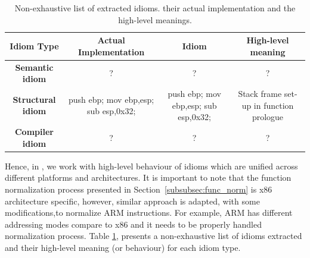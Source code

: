 \begin{table}[!th]
	\begin{center}
  \begin{tabular}{|c|c|c|c|}
  \hline
  \rule[-1ex]{0pt}{2.5ex} \textbf{Idiom Type} & \textbf{Actual Implementation} & \textbf{Idiom} & \textbf{High-level meaning} \\
  \hline
  \rule[-1ex]{0pt}{2.5ex} \textbf{Semantic idiom} & ? & ? & ? \\
  \hline
  \rule[-1ex]{0pt}{2.5ex} \textbf{Structural idiom} & {push ebp;	mov ebp,esp; 	sub esp,0x32;} & {push ebp;	mov ebp,esp; 	sub esp,0x32;} & Stack frame set-up in function prologue \\
  \hline
  \rule[-1ex]{0pt}{2.5ex} \textbf{Compiler idiom} & ? & ? & ? \\
  \hline
  \end{tabular}
   \vspace{2ex}
  \caption{Non-exhaustive list of extracted idioms. their actual implementation and the high-level meanings. }\label{tab:idiom_list}
  \end{center}
\end{table}

Hence, in \tool, we work with high-level behaviour of idioms which are unified across different platforms and architectures. It is important to note that the function normalization process presented in Section~\ref{subsubsec:func_norm} is x86 architecture specific, however, similar approach is adapted, with some modifications,to normalize ARM instructions. For example, ARM has different addressing modes compare to x86 and it needs to be properly handled normalization process. Table \ref{tab:idiom_list}, presents a non-exhaustive list of idioms extracted and their high-level meaning (or behaviour) for each idiom type.
